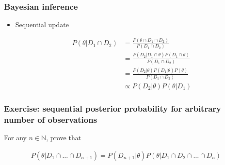 \begin{frame}
    \frametitle{Bayesian inference}

    \begin{itemize}

        \item Sequential update

        \begin{align*}
            P(\theta|D_1\cap D_2)&=\frac{P(\theta\cap D_1\cap D_2)}{P(D_1\cap D_2)}\\
                                 &=\frac{P(D_2|D_1\cap\theta)P(D_1\cap\theta)}{P(D_1\cap D_2)}\\
                                 &=\frac{P(D_2|\theta)P(D_1|\theta)P(\theta)}{P(D_1\cap D_2)}\\
                                 &\propto P(D_2|\theta)P(\theta|D_1)
        \end{align*}

    \end{itemize}

\end{frame}

\begin{frame}
    \frametitle{Exercise: sequential posterior probability for arbitrary number of observations}

    For any $n\in\mathbb{N}$, prove that

    \begin{align*}
        P(\theta|D_1\cap\ldots\cap D_{n+1})=P(D_{n+1}|\theta)P(\theta|D_1\cap D_2\cap\ldots\cap D_n)
    \end{align*}

\end{frame}

